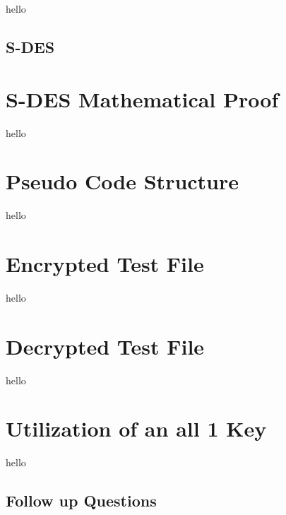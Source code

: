 \documentclass[]{article}
\begin{document}
hello


\break

\vspace*{-0.8cm}
\begin{center}
	\section*{S-DES}
\end{center}

\vspace*{0.8cm}
\section*{S-DES Mathematical Proof}

hello

\section*{Pseudo Code Structure}

hello

\section*{Encrypted Test File}

hello

\section*{Decrypted Test File}

hello

\section*{Utilization of an all 1 Key}

hello

\break

\vspace*{-0.8cm}
\begin{center}
	\section*{Follow up Questions}
\end{center}

\vspace*{0.8cm}
\end{document}
